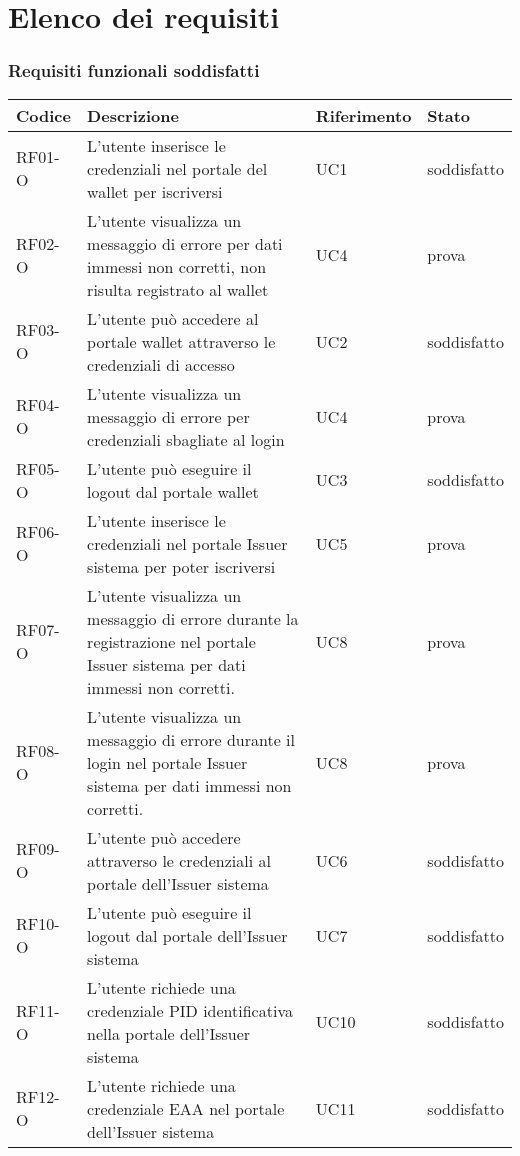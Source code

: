 \section{Elenco dei requisiti}
\subsubsection*{Requisiti funzionali soddisfatti} %
    \begin{longtable}{|p{}|p{}|p{}|p{}|}
        \hline
        \textbf{Codice} & \textbf{Descrizione} & \textbf{Riferimento} & \textbf{Stato}\\
        \hline
        RF01-O & L'utente inserisce le credenziali nel portale del wallet per iscriversi & UC1 & soddisfatto\\
        RF02-O & L'utente visualizza un messaggio di errore per dati immessi non corretti, non risulta registrato al wallet & UC4& prova\\
        RF03-O & L'utente può accedere al portale wallet attraverso le credenziali di accesso & UC2& soddisfatto\\
        RF04-O & L'utente visualizza un messaggio di errore per credenziali sbagliate al login & UC4& prova\\ 
        RF05-O & L'utente può eseguire il logout dal portale wallet & UC3& soddisfatto\\
        RF06-O & L'utente inserisce le credenziali nel portale Issuer sistema per poter iscriversi & UC5& prova\\
        RF07-O & L'utente visualizza un messaggio di errore durante la registrazione nel portale Issuer sistema per dati immessi non corretti. & UC8& prova\\
        RF08-O & L'utente visualizza un messaggio di errore durante il login nel portale Issuer sistema per dati immessi non corretti. & UC8& prova\\
        RF09-O & L'utente può accedere attraverso le credenziali al portale dell'Issuer sistema & UC6& soddisfatto\\
        RF10-O & L'utente può eseguire il logout dal portale dell'Issuer sistema & UC7& soddisfatto\\
        RF11-O & L'utente richiede una credenziale PID identificativa nella portale dell'Issuer sistema & UC10& soddisfatto\\
        RF12-O & L'utente richiede una credenziale EAA nel portale dell'Issuer sistema & UC11& soddisfatto\\

\end{longtable}
